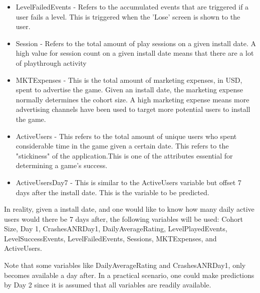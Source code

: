 \begin{itemize}
\item LevelFailedEvents - Refers to the accumulated events that are triggered if a user fails a level. This is triggered when the 'Lose' screen is shown to the user.
\item Session - Refers to the total amount of play sessions on a given install date. A high value for session count on a given install date means that there are a lot of playthrough activity 
\item MKTExpenses - This is the total amount of marketing expenses, in USD, spent to advertise the game. Given an install date, the marketing expense normally determines the cohort size. A high marketing expense means more advertising channels have been used to target more potential users to install the game.
\item ActiveUsers - This refers to the total amount of unique users who spent considerable time in the game given a certain date. This refers to the "stickiness" of the application.This is one of the attributes essential for determining a game's success.
\item ActiveUsersDay7 - This is similar to the ActiveUsers variable but offset 7 days after the install date. This is the variable to be predicted. 
\end{itemize}

In reality, given a install date, and one would like to know how many daily active users would there be 7 days after, the following variables will be used: Cohort Size, Day 1, CrashesANRDay1, DailyAverageRating, LevelPlayedEvents, LevelSuccessEvents, LevelFailedEvents, Sessions, MKTExpenses, and ActiveUsers.

Note that some variables like DailyAverageRating and CrashesANRDay1, only becomes available a day after. In a practical scenario, one could make predictions by Day 2 since it is assumed that all variables are readily available.